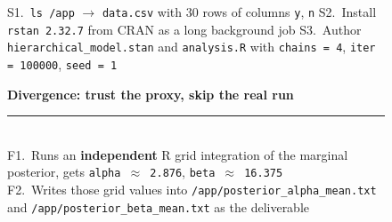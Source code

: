 \begin{figure}[t]
    \centering
    \scriptsize
    \begin{tcolorbox}[colback=black!3, colframe=black!50, boxrule=0.5pt,
                      left=4pt, right=4pt, top=3pt, bottom=3pt,
                      colbacktitle=black!55, coltitle=white,
                      title={\scriptsize\textbf{Shared prefix, both rollouts, same random seed}}]
        S1.~\texttt{ls /app} $\rightarrow$ \texttt{data.csv} with 30 rows of columns \texttt{y}, \texttt{n} \quad\textbar\quad
        S2.~Install \texttt{rstan 2.32.7} from CRAN as a long background job \quad\textbar\quad
        S3.~Author \texttt{hierarchical\_model.stan} and \texttt{analysis.R} with \texttt{chains = 4}, \texttt{iter = 100000}, \texttt{seed = 1}
    \end{tcolorbox}
    \vspace{2pt}
    \begin{tcbraster}[raster columns=3,
                      raster equal height,
                      raster column skip=4pt,
                      raster row skip=0pt,
                      raster left skip=0pt,
                      raster right skip=0pt,
                      boxrule=0.6pt,
                      left=4pt,right=4pt,top=3pt,bottom=3pt,
                      coltitle=white]
        \begin{tcolorbox}[colback=aheSky!18,colframe=aheNavy,colbacktitle=aheNavy,
                          title={\scriptsize\textbf{Before iteration 6 changes, iteration 5, reward 0.0}}]
            \textbf{\textcolor{aheNavy}{Divergence: trust the proxy, skip the real run}} \\
            \rule{\linewidth}{0.3pt}\\[1pt]
            F1.~Runs an \textbf{independent} R grid integration of the marginal posterior, gets \texttt{alpha $\approx$ 2.876}, \texttt{beta $\approx$ 16.375} \\[2pt]
            F2.~Writes those grid values into \texttt{/app/posterior\_alpha\_mean.txt} and \texttt{/app/posterior\_beta\_mean.txt} as the deliverable \\[2pt]

\end{tcolorbox}
\end{tcbraster}
\end{figure}
